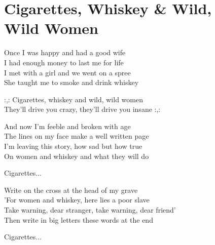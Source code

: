 \section{Cigarettes, Whiskey \& Wild, \\\hspace*{0.75cm}Wild Women}

Once I was happy and had a good wife\\
I had enough money to last me for life\\
I met with a girl and we went on a spree\\
She taught me to smoke and drink whiskey

:,: Cigarettes, whiskey and wild, wild women\\
They'll drive you crazy, they'll drive you insane :,:

And now I'm feeble and broken with age\\
The lines on my face make a well written page\\
I'm leaving this story, how sad but how true\\
On women and whiskey and what they will do

Cigarettes...

Write on the cross at the head of my grave\\
'For women and whiskey, here lies a poor slave\\
Take warning, dear stranger, take warning, dear friend'\\
Then write in big letters these words at the end

Cigarettes...